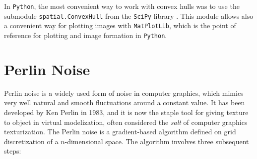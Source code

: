     In \texttt{Python}, the most convenient way to work with convex hulls was to use the submodule \texttt{spatial.ConvexHull} from the \texttt{SciPy} library \cite{2020SciPy-NMeth}. This module allows also a convenient way for plotting images with \texttt{MatPlotLib}, which is the point of reference for plotting and image formation in \texttt{Python}.

\section{Perlin Noise} \label{ssec:perlin}
    Perlin noise is a widely used form of noise in computer graphics, which mimics very well natural and smooth fluctuations around a constant value. It has been developed by Ken Perlin in 1983, and it is now the staple tool for giving texture to object in virtual modelization, often considered the \textit{salt} of computer graphics texturization.
    The Perlin noise is a gradient-based algorithm defined on grid discretization of a $n$-dimensional space. The algorithm involves three subsequent steps:

